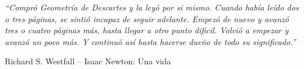 \documentclass[a4paper,11pt,twoside]{book}
\begin{document}


\clearpage\thispagestyle{empty}\mbox{}\clearpage

\vspace*{0.2\textheight}

{\large \textit{ {\huge ``}Compr\'o Geometr\'ia de Descartes y la ley\'o por si mismo.
Cuando hab\'ia le\'ido dos o tres p\'aginas, se sinti\'o incapaz de seguir
adelante. Empez\'o de nuevo y avanz\'o tres o cuatro p\'aginas m\'as, hasta
llegar a otro punto dificil. Volvi\'o a empezar y avanz\'o un poco m\'as. Y
continu\'o as\'i hasta hacerse dueño de todo su significado.{\huge ''}}}
\begin{flushright}
  Richard S. Westfall -- Isaac Newton: Una vida
\end{flushright}

\clearpage\thispagestyle{empty}\mbox{}\clearpage





\tableofcontents

\mainmatter %
\pagestyle{fancy} %



%




\begin{appendices}
    
\end{appendices}



\end{document}
